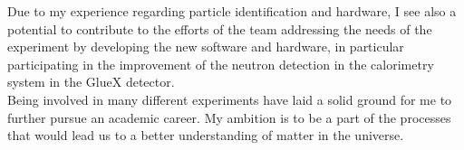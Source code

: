 \documentclass[a4paper,roman]{article}
\begin{document}
Due to my experience regarding particle identification and hardware, I see also a potential to contribute to the efforts of the team addressing the needs of the experiment by developing the new software and hardware, in particular participating in the improvement of the neutron detection in the calorimetry system in the GlueX detector.\\
Being involved in many different experiments have laid a solid ground for me to further pursue an academic career. My ambition is to be a part of the processes that would lead us to a better understanding of matter in the universe.
\end{document}
